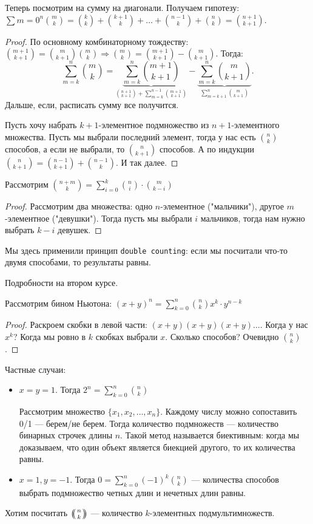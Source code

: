 Теперь посмотрим на сумму на диагонали. Получаем гипотезу: $\sum{m=0}^n \binom{m}{k}=\binom{k}{k} + \binom{k+1}{k} + \ldots + \binom{n-1}{k} + \binom{n}{k} = \binom{n+1}{k+1}$.
\begin{proof}
    По основному комбинаторному тождеству: $\binom{m + 1}{k + 1} = \binom{m}{k + 1}  \binom{m}{k} \Rightarrow \binom{m}{k} = \binom{m + 1}{k + 1} - \binom{m}{k+1}$. Тогда: \[
        \sum_{m=k}^{n} \binom{m}{k} = \underbrace{\sum_{m=k}^n \binom{m+1}{k+1}}_{\binom{n+1}{k+1} + \sum_{m=k}^{n-1} \binom{m+1}{k+1} } - \underbrace{\sum_{m=k}^{n} \binom{m}{k+1}}_{\sum_{m=k+1}^{n} \binom{m}{k+1}}
    .\] 
    Дальше, если, расписать сумму все получится.

    Пусть хочу набрать $k+1$-элементное подмножество из  $n+1$-элементного множества. Пусть мы выбрали последний элемент, тогда у нас есть $\binom{n}{k}$ способов, а если не выбрали, то  $\binom{n}{k+1}$ способов. А по индукции  $\binom{n}{k+1} = \binom{n-1}{k+1} + \binom{n - 1}{k}$. И так далее.
\end{proof}
\slashn
Рассмотрим $\binom{n+m}{k} = \sum_{i=0}^k \binom{n}{i} \cdot \binom{m}{k-i}$
 \begin{proof}
     Рассмотрим два множества: одно $n$-элементное ("мальчики"), другое  $m$-элементное ("девушки"). Тогда пусть мы выбрали  $i$ мальчиков, тогда нам нужно выбрать $k-i$ девушек. 
\end{proof}
\slashn
Мы здесь применили принцип \texttt{double counting}: если мы посчитали что-то двумя способами, то результаты равны.

Подробности на втором курсе.

Рассмотрим бином Ньютона: $(x+y)^n = \sum_{k=0}^n \binom{n}{k} x^k \cdot y^{n-k}$
\begin{proof}
    Раскроем скобки в левой части: $(x+y)(x+y)(x+y)\ldots$. Когда у нас $x^k$? Когда мы ровно в  $k$ скобках выбрали  $x$. Сколько способов? Очевидно  $\binom{n}{k}$.
\end{proof}
Частные случаи:
\begin{itemize}
    \item $x=y=1$. Тогда  $2^n = \sum_{k=0}^n \binom{n}{k}$
    
        Рассмотрим множество $\{x_1,x_2,\ldots,x_n\}$. Каждому числу можно сопоставить 0/1 --- берем/не берем. Тогда количество подмножеств --- количество бинарных строчек длины $n$. Такой метод называется биективным: когда мы доказываем, что один объект является биекцией другого, то их количества равны.
    \item $x = 1, y = -1$. Тогда  $0 = \sum_{k=0}^n (-1)^k \binom{n}{k}$ --- количества способов выбрать подмножество четных длин и нечетных длин равны.
\end{itemize}
Хотим посчитать $\multiset{n}{k}$ --- количество  $k$-элементных подмультимножеств.

